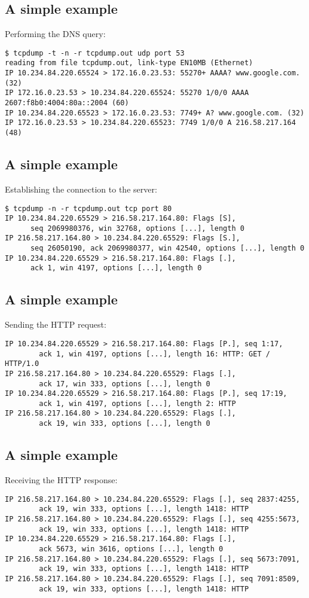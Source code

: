\documentclass[xga]{xdvislides}
\begin{document}
\subsection{A simple example}
Performing the DNS query:
\begin{verbatim}
$ tcpdump -t -n -r tcpdump.out udp port 53
reading from file tcpdump.out, link-type EN10MB (Ethernet)
IP 10.234.84.220.65524 > 172.16.0.23.53: 55270+ AAAA? www.google.com. (32)
IP 172.16.0.23.53 > 10.234.84.220.65524: 55270 1/0/0 AAAA 2607:f8b0:4004:80a::2004 (60)
IP 10.234.84.220.65523 > 172.16.0.23.53: 7749+ A? www.google.com. (32)
IP 172.16.0.23.53 > 10.234.84.220.65523: 7749 1/0/0 A 216.58.217.164 (48)
\end{verbatim}

\subsection{A simple example}
Establishing the connection to the server:
\begin{verbatim}
$ tcpdump -n -r tcpdump.out tcp port 80
IP 10.234.84.220.65529 > 216.58.217.164.80: Flags [S],
      seq 2069980376, win 32768, options [...], length 0
IP 216.58.217.164.80 > 10.234.84.220.65529: Flags [S.],
      seq 26050190, ack 2069980377, win 42540, options [...], length 0
IP 10.234.84.220.65529 > 216.58.217.164.80: Flags [.],
      ack 1, win 4197, options [...], length 0
\end{verbatim}

\subsection{A simple example}
Sending the HTTP request:
\begin{verbatim}
IP 10.234.84.220.65529 > 216.58.217.164.80: Flags [P.], seq 1:17,
        ack 1, win 4197, options [...], length 16: HTTP: GET / HTTP/1.0
IP 216.58.217.164.80 > 10.234.84.220.65529: Flags [.],
        ack 17, win 333, options [...], length 0
IP 10.234.84.220.65529 > 216.58.217.164.80: Flags [P.], seq 17:19,
        ack 1, win 4197, options [...], length 2: HTTP
IP 216.58.217.164.80 > 10.234.84.220.65529: Flags [.],
        ack 19, win 333, options [...], length 0
\end{verbatim}

\subsection{A simple example}
Receiving the HTTP response:
\begin{verbatim}
IP 216.58.217.164.80 > 10.234.84.220.65529: Flags [.], seq 2837:4255,
        ack 19, win 333, options [...], length 1418: HTTP
IP 216.58.217.164.80 > 10.234.84.220.65529: Flags [.], seq 4255:5673,
        ack 19, win 333, options [...], length 1418: HTTP
IP 10.234.84.220.65529 > 216.58.217.164.80: Flags [.],
        ack 5673, win 3616, options [...], length 0
IP 216.58.217.164.80 > 10.234.84.220.65529: Flags [.], seq 5673:7091,
        ack 19, win 333, options [...], length 1418: HTTP
IP 216.58.217.164.80 > 10.234.84.220.65529: Flags [.], seq 7091:8509,
        ack 19, win 333, options [...], length 1418: HTTP
\end{verbatim}
\end{document}
